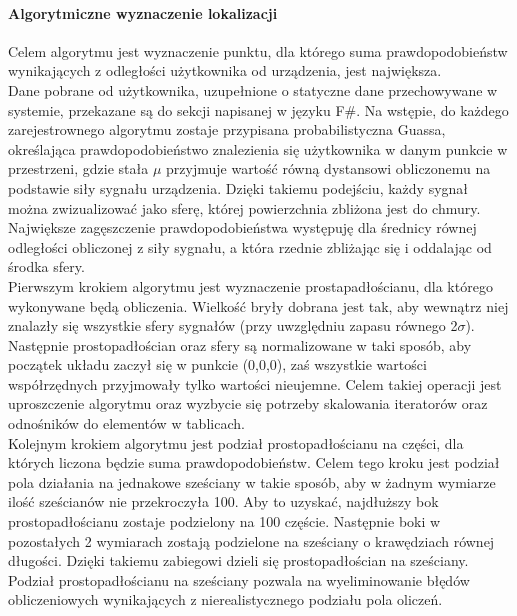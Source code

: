 \documentclass{article}
\begin{document}
		\paragraph{Algorytmiczne wyznaczenie lokalizacji}
		Celem algorytmu jest wyznaczenie punktu, dla którego suma prawdopodobieństw wynikających z odległości użytkownika od urządzenia, jest największa.\\
		Dane pobrane od użytkownika, uzupełnione o statyczne dane przechowywane w systemie, przekazane są do sekcji napisanej w języku F\#. Na wstępie, do każdego zarejestrownego algorytmu zostaje przypisana probabilistyczna Guassa, określająca prawdopodobieństwo znalezienia się użytkownika w danym punkcie w przestrzeni, gdzie stała $\mu$ przyjmuje wartość równą dystansowi obliczonemu na podstawie siły sygnału urządzenia. Dzięki takiemu podejściu, każdy sygnał można zwizualizować jako sferę, której powierzchnia zbliżona jest do chmury. Największe zagęszczenie prawdopodobieństwa występuję dla średnicy równej odległości obliczonej z siły sygnału, a która rzednie zbliżając się i oddalając od środka sfery.\\
		Pierwszym krokiem algorytmu jest wyznaczenie prostapadłościanu, dla którego wykonywane będą obliczenia. Wielkość bryły dobrana jest tak, aby wewnątrz niej znalazły się wszystkie sfery sygnałów (przy uwzględniu zapasu równego 2$\sigma$). Następnie prostopadłościan oraz sfery są normalizowane w taki sposób, aby początek układu zaczył się w punkcie (0,0,0), zaś wszystkie wartości współrzędnych przyjmowały tylko wartości nieujemne. Celem takiej operacji jest uproszczenie algorytmu oraz wyzbycie się potrzeby skalowania iteratorów oraz odnośników do elementów w tablicach.\\
		Kolejnym krokiem algorytmu jest podział prostopadłościanu na części, dla których liczona będzie suma prawdopodobieństw. Celem tego kroku jest podział pola działania na jednakowe sześciany w takie sposób, aby w żadnym wymiarze ilość sześcianów nie przekroczyła 100. Aby to uzyskać, najdłuższy bok prostopadłościanu zostaje podzielony na 100 częście. Następnie boki w pozostałych 2 wymiarach zostają podzielone na sześciany o krawędziach równej długości. Dzięki takiemu zabiegowi dzieli się prostopadłościan na sześciany. Podział prostopadłościanu na sześciany pozwala na wyeliminowanie błędów obliczeniowych wynikających z nierealistycznego podziału pola oliczeń.\\
\end{document}
